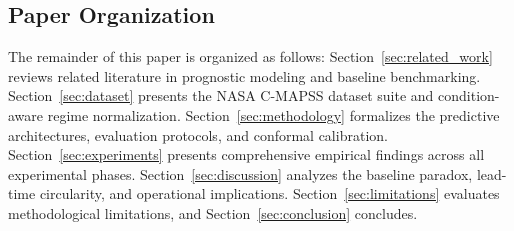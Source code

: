 \subsection{Paper Organization}
The remainder of this paper is organized as follows: Section~\ref{sec:related_work} reviews related literature in prognostic modeling and baseline benchmarking. Section~\ref{sec:dataset} presents the NASA C-MAPSS dataset suite and condition-aware regime normalization. Section~\ref{sec:methodology} formalizes the predictive architectures, evaluation protocols, and conformal calibration. Section~\ref{sec:experiments} presents comprehensive empirical findings across all experimental phases. Section~\ref{sec:discussion} analyzes the baseline paradox, lead-time circularity, and operational implications. Section~\ref{sec:limitations} evaluates methodological limitations, and Section~\ref{sec:conclusion} concludes.
